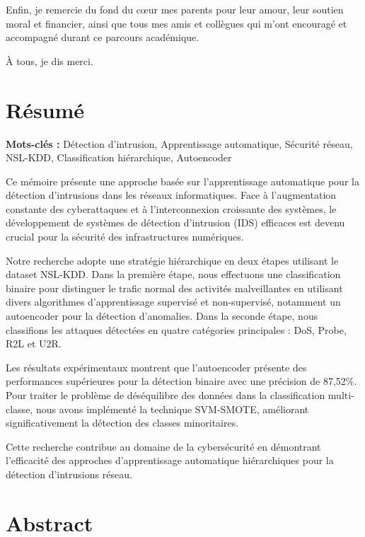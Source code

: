\documentclass[12pt,a4paper]{report}
\begin{document}
Enfin, je remercie du fond du cœur mes parents pour leur amour, leur soutien moral et financier, ainsi que tous mes amis et collègues qui m'ont encouragé et accompagné durant ce parcours académique.

À tous, je dis merci.

\newpage
\chapter*{Résumé}

\textbf{Mots-clés :} Détection d'intrusion, Apprentissage automatique, Sécurité réseau, NSL-KDD, Classification hiérarchique, Autoencoder

Ce mémoire présente une approche basée sur l'apprentissage automatique pour la détection d'intrusions dans les réseaux informatiques. Face à l'augmentation constante des cyberattaques et à l'interconnexion croissante des systèmes, le développement de systèmes de détection d'intrusion (IDS) efficaces est devenu crucial pour la sécurité des infrastructures numériques.

Notre recherche adopte une stratégie hiérarchique en deux étapes utilisant le dataset NSL-KDD. Dans la première étape, nous effectuons une classification binaire pour distinguer le trafic normal des activités malveillantes en utilisant divers algorithmes d'apprentissage supervisé et non-supervisé, notamment un autoencoder pour la détection d'anomalies. Dans la seconde étape, nous classifions les attaques détectées en quatre catégories principales : DoS, Probe, R2L et U2R.

Les résultats expérimentaux montrent que l'autoencoder présente des performances supérieures pour la détection binaire avec une précision de 87,52\%. Pour traiter le problème de déséquilibre des données dans la classification multi-classe, nous avons implémenté la technique SVM-SMOTE, améliorant significativement la détection des classes minoritaires.

Cette recherche contribue au domaine de la cybersécurité en démontrant l'efficacité des approches d'apprentissage automatique hiérarchiques pour la détection d'intrusions réseau.

\newpage
\chapter*{Abstract}
\end{document}
